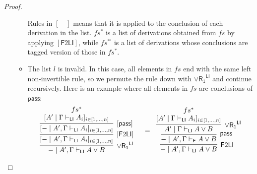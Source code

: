 \documentclass[submission,copyright,creativecommons]{eptcs}
\theoremstyle{definition}
\newcommand{\pass}{\mathsf{pass}}
\newcommand{\andlone}{\land \mathsf{L_{1}}}
\newcommand{\orrone}{\lor \mathsf{R_{1}}}
\newcommand{\LI}{\mathsf{LI}}
\newcommand{\F}{\mathsf{F}}
\newcommand{\tL}{\mathbb{L}}
\newcommand{\proofbox}[1]{\begin{tabular}{l} #1 \end{tabular}}
\begin{document}
\begin{proof}
\begin{itemize}
\begin{itemize}
      Rules in ${[ \quad ]}$ means that it is applied to the conclusion of each derivation in the list.
      $fs^{*}$ is a list of derivations obtained from $fs$ by applying $[\F 2 \LI]$, while $fs^{*'}$ is a list of derivations whose conclusions are tagged version of those in $fs^{*}$.
      \item The list $l$ is invalid. In this case, all elements in $fs$ end with the same left non-invertible rule, so we permute the rule down with $\orrone^{\LI}$ and continue recursively.
      Here is an example where all elements in $fs$ are conclusions of $\pass$:
      \begin{displaymath}
        \begin{array}{cc}
          \proofbox{
            \infer[\orrone^{\LI}]{- \mid A' , \Gamma \vdash_{\LI} A \lor B}{
              \infer[ {[\F 2 \LI]} ]{[- \mid A' , \Gamma \vdash_{\LI} A_i]_{i \in [1 , \dots , n]}}{
                \infer[ {[\pass]} ]{[- \mid A' , \Gamma \vdash_{\LI} A_i]_{i \in [1 , \dots , n]}}{
                  \deduce{[A' \mid \Gamma \vdash_{\LI} A_i]_{i \in [1 , \dots , n]}}{fs^{*}}
                }
              }
            }
          }
          &
          =
          \proofbox{
            \infer[\F 2 \LI]{- \mid A' , \Gamma \vdash_{\LI} A \lor B}{
              \infer[\pass]{- \mid A' , \Gamma \vdash_{\F} A \lor B}{
                \infer[\orrone^{\LI}]{A' \mid \Gamma \vdash_{\LI} A \lor B}{
                  \deduce{[A' \mid \Gamma \vdash_{\LI} A_i]_{i \in [1 , \dots , n]}}{fs^{*}}
                }
              }
            }
          }
        \end{array}
      \end{displaymath}

\end{itemize}
\end{itemize}
\end{proof}
\end{document}
